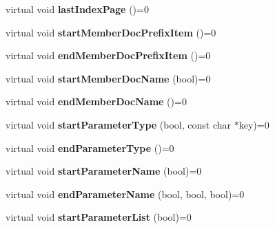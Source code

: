 \begin{DoxyCompactItemize}
\item 
\hypertarget{class_output_generator_a807abe0bc4d8ed37abf379562ba2ca9a}{virtual void {\bfseries last\-Index\-Page} ()=0}\label{class_output_generator_a807abe0bc4d8ed37abf379562ba2ca9a}

\item 
\hypertarget{class_output_generator_a658f416ccd2f8a8a46cd22331b9fd253}{virtual void {\bfseries start\-Member\-Doc\-Prefix\-Item} ()=0}\label{class_output_generator_a658f416ccd2f8a8a46cd22331b9fd253}

\item 
\hypertarget{class_output_generator_a290a53ddb1c41fe9f6fd30fa7ae50e46}{virtual void {\bfseries end\-Member\-Doc\-Prefix\-Item} ()=0}\label{class_output_generator_a290a53ddb1c41fe9f6fd30fa7ae50e46}

\item 
\hypertarget{class_output_generator_a647356de3a1db311a86c3e74f36e2cc1}{virtual void {\bfseries start\-Member\-Doc\-Name} (bool)=0}\label{class_output_generator_a647356de3a1db311a86c3e74f36e2cc1}

\item 
\hypertarget{class_output_generator_aa7865c3949eb72b2087b4434a71f0ce0}{virtual void {\bfseries end\-Member\-Doc\-Name} ()=0}\label{class_output_generator_aa7865c3949eb72b2087b4434a71f0ce0}

\item 
\hypertarget{class_output_generator_a8d442ef684f2434a56359080bef2146d}{virtual void {\bfseries start\-Parameter\-Type} (bool, const char $\ast$key)=0}\label{class_output_generator_a8d442ef684f2434a56359080bef2146d}

\item 
\hypertarget{class_output_generator_a91242bab78594acdf011da8b149a10b0}{virtual void {\bfseries end\-Parameter\-Type} ()=0}\label{class_output_generator_a91242bab78594acdf011da8b149a10b0}

\item 
\hypertarget{class_output_generator_a202ebaaf60fff4ecc99efa8187a93e58}{virtual void {\bfseries start\-Parameter\-Name} (bool)=0}\label{class_output_generator_a202ebaaf60fff4ecc99efa8187a93e58}

\item 
\hypertarget{class_output_generator_ae46f7c2c2ebc81fbadde05ef3ab98e7a}{virtual void {\bfseries end\-Parameter\-Name} (bool, bool, bool)=0}\label{class_output_generator_ae46f7c2c2ebc81fbadde05ef3ab98e7a}

\item 
\hypertarget{class_output_generator_a38c1e9ee2b26d0a2d52ddaa27febe1a4}{virtual void {\bfseries start\-Parameter\-List} (bool)=0}\label{class_output_generator_a38c1e9ee2b26d0a2d52ddaa27febe1a4}


\end{DoxyCompactItemize}
